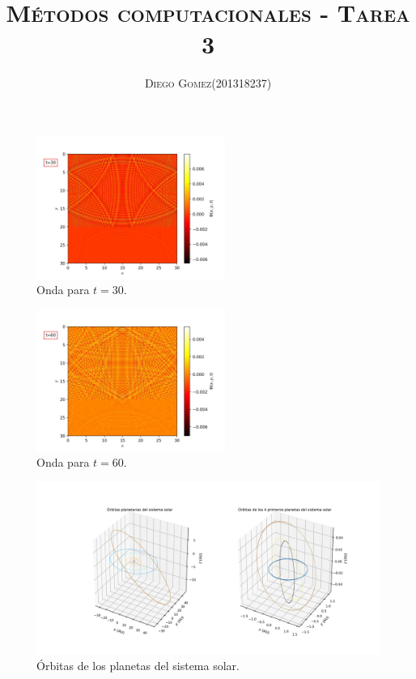 \documentclass{article}
\title{\textsc{\Large{Métodos computacionales - Tarea 3}}}
\author{\textsc{\Large{Diego Gomez}}\hspace{10pt}(201318237)}
\date{}
\begin{document}
    \maketitle

    \begin{figure}[h]
        \centering
        \includegraphics[width=0.55\textwidth]{Onda30.jpeg}
        \caption{Onda para $t=30$.}
        \label{fig:o30}
    \end{figure}
    
    \begin{figure}[h]
        \centering
        \includegraphics[width=0.55\textwidth]{Onda60.jpeg}
        \caption{Onda para $t=60$.}
        \label{fig:o60}
    \end{figure}

    \begin{figure}[h]
    	\centering
        \includegraphics[width=\textwidth]{Planetas.jpeg}
        \caption{Órbitas de los planetas del sistema solar.}
        \label{fig:orb}
    \end{figure}    
\end{document}
